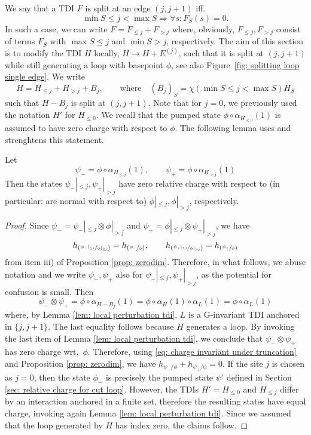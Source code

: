 We say that a TDI $F$ is split at an edge $(j,j+1)$ iff.\
$$
\min S \leq j <\max S  \Rightarrow \forall s: F_S(s)=0.
$$
In such a case, we can write $F=F_{\leq j}+F_{>j}$ where, obviously, $F_{\leq j}, F_{>j}$ consist of terms $F_S$ with $\max S\leq j$ and $\min S>j$, respectively. The aim of this section is to modify the TDI $H$ locally, $H \to H+E^{(j)}$, such that it is split at $(j,j+1)$  while still generating a loop with basepoint $\phi$, see also Figure~\ref{fig: splitting loop single edge}. 
We write 
$$
H=H_{\leq j}+H_{>j} + B_j,\qquad \text{where}\quad (B_j)_S= \chi( \min S \leq j <\max S)  H_S
$$ 
such that $H-B_j$ is split at $(j,j+1)$. 
Note that for $j=0$, we previously used the notation $H'$ for $H_{\leq 0}$. 
We recall that the pumped state $\phi\circ\alpha_{H_{\leq 0}}(1)$ is assumed to have zero charge with respect to $\phi$. The following lemma uses and strenghtens this statement.
\begin{lemma}\label{lem: zero charge both sides}
	Let 
	$$
	\psi_-=\phi\circ\alpha_{H_{\leq j}}(1), \qquad \psi_+=\phi\circ\alpha_{H_{> j}}(1)
	$$
	Then the states $\psi_-|_{\leq j},\psi_+|_{> j} $ have zero relative charge with respect to (in particular: are normal with respect to) $\phi|_{\leq j},\phi|_{> j} $, respectively. 
\end{lemma}
\begin{proof}
	Since $\psi_-=\psi_-|_{\leq j} \otimes \phi|_{> j}$ and  $\psi_+=\phi|_{\leq j} \otimes \psi_+|_{> j}$, we have  
	\begin{equation}\label{eq: charge invariant under truncation}
		h_{\left(\sfrac{\psi_-|_{\leq j}}{\phi|_{\leq j}}\right)} =  h_{\left(\sfrac{\psi_-}{\phi}\right)},\qquad   h_{\left(\sfrac{\psi_+|_{>j}}{\phi|_{> j}}\right)}=  h_{\left(\sfrac{\psi_+}{\phi}\right)}
	\end{equation}
	from item iii) of Proposition \ref{prop: zerodim}. 
	Therefore, in what follows, we abuse notation and we write $\psi_-,\psi_+ $ also for $\psi_-|_{\leq j},\psi_+|_{> j} $, as the potential for confusion is small. 
	Then
	$$
	\psi_-\otimes\psi_+= \phi\circ \alpha_{H-B_j}(1)= \phi\circ\alpha_{H}(1)\circ   \alpha_L(1)=  \phi  \circ \alpha_L(1)
	$$
	where, by Lemma \ref{lem: local perturbation tdi}, $L$ is a G-invariant TDI anchored in $\{j,j+1\}$. The last equality follows because $H$ generates a loop. By invoking the last item of Lemma \ref{lem: local perturbation tdi}, we conclude that $\psi_- \otimes\psi_+$ has zero charge wrt.\ $\phi$. Therefore, using \eqref{eq: charge invariant under truncation} and Proposition \ref{prop: zerodim}, we have $h_{\psi_-/\phi}+h_{\psi_+/\phi}=0$.  
	If the site $j$ is chosen as $j=0$, then the state $\phi_-$ is precisely the pumped state $\psi'$ defined in Section \eqref{sec: relative charge for cut loop}. However, the TDIs $H'=H_{\leq 0}$ and $H_{\leq j}$ differ by an interaction anchored in a finite set, therefore the resulting states have equal charge, invoking again Lemma \ref{lem: local perturbation tdi}. Since we assumed that the loop generated by $H$ has index zero, the claims  follow. 
\end{proof}


